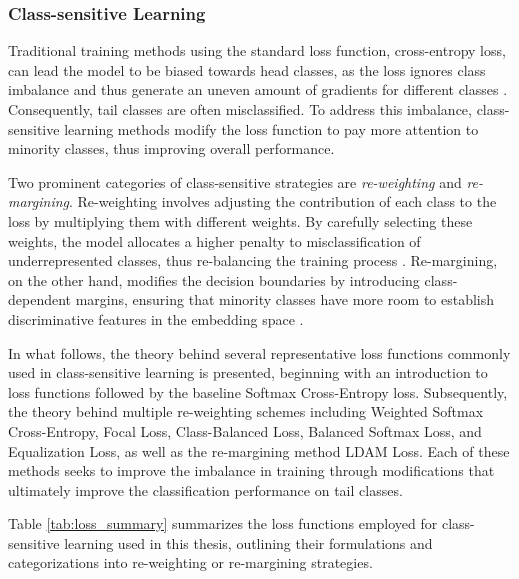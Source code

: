 
\subsubsection{Class-sensitive Learning}
Traditional training methods using the standard loss function, cross-entropy loss, can lead the model to be biased towards head classes, as the loss ignores class imbalance and thus generate an uneven amount of gradients for different classes \cite{zhang2023deep}. Consequently, tail classes are often misclassified. To address this imbalance, class-sensitive learning methods modify the loss function to pay more attention to minority classes, thus improving overall performance.

Two prominent categories of class-sensitive strategies are \emph{re-weighting} and \emph{re-margining}. Re-weighting involves adjusting the contribution of each class to the loss by multiplying them with different weights. By carefully selecting these weights, the model allocates a higher penalty to misclassification of underrepresented classes, thus re-balancing the training process \cite{zhang2023deep}. Re-margining, on the other hand, modifies the decision boundaries by introducing class-dependent margins, ensuring that minority classes have more room to establish discriminative features in the embedding space \cite{zhang2023deep, cao2019learningimbalanceddatasetslabeldistributionaware}.

In what follows, the theory behind several representative loss functions commonly used in class-sensitive learning is presented, beginning with an introduction to loss functions followed by the baseline Softmax Cross-Entropy loss. Subsequently, the theory behind multiple re-weighting schemes including Weighted Softmax Cross-Entropy, Focal Loss, Class-Balanced Loss, Balanced Softmax Loss, and Equalization Loss, as well as the re-margining method LDAM Loss. Each of these methods seeks to improve the imbalance in training through modifications that ultimately improve the classification performance on tail classes.

Table \ref{tab:loss_summary} summarizes the loss functions employed for class-sensitive learning used in this thesis, outlining their formulations and categorizations into re-weighting or re-margining strategies.


